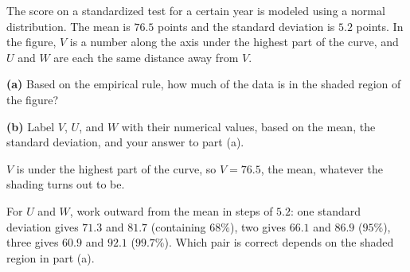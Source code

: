 \documentclass[12pt]{ximera}
\begin{document}
\begin{problem}
The score on a standardized test for a certain year is modeled using a normal
distribution. The mean is $76.5$ points and the standard deviation is $5.2$ points.
In the figure, $V$ is a number along the axis under the highest part of the curve,
and $U$ and $W$ are each the same distance away from $V$.


\begin{prompt}
\textbf{(a)} Based on the empirical rule, how much of the data is in the shaded
region of the figure?
\begin{freeResponse}
\end{freeResponse}
\end{prompt}

\begin{prompt}
\textbf{(b)} Label $V$, $U$, and $W$ with their numerical values, based on the mean,
the standard deviation, and your answer to part (a).
\begin{freeResponse}
\end{freeResponse}

\begin{solution}
$V$ is under the highest part of the curve, so $V = 76.5$, the mean, whatever the
shading turns out to be.

For $U$ and $W$, work outward from the mean in steps of $5.2$: one standard deviation
gives $71.3$ and $81.7$ (containing $68\%$), two gives $66.1$ and $86.9$ ($95\%$),
three gives $60.9$ and $92.1$ ($99.7\%$). Which pair is correct depends on the shaded
region in part (a).
\end{solution}
\end{prompt}
\end{problem}
\end{document}

